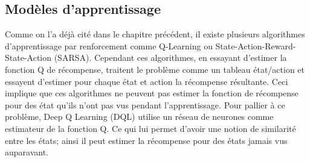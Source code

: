 \subsection{Modèles d'apprentissage}\label{DQL}
Comme on l'a déjà cité dans le chapitre précédent, il existe plusieurs algorithmes d'apprentissage par renforcement comme Q-Learning ou State-Action-Reward-State-Action (SARSA)\cite{Rummery1994}. Cependant ces algorithmes, en essayant d'estimer la fonction Q de récompense, traitent le problème comme un tableau état/action et essayent d'estimer pour chaque état et action la récompense résultante. Ceci implique que ces algorithmes ne peuvent pas estimer la fonction de récompense pour des état qu'ils n'ont pas vus pendant l'apprentissage. Pour pallier à ce problème, Deep Q Learning (DQL)\cite{Mnih2015} utilise un réseau de neurones comme estimateur de la fonction Q. Ce qui lui permet d'avoir une notion de similarité entre les états; ainsi il peut estimer la récompense pour des états jamais vus auparavant.

